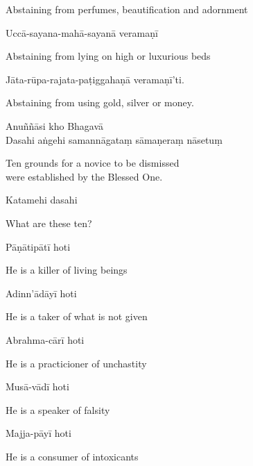 \begin{english}
  Abstaining from perfumes, beautification and adornment
\end{english}

Uccā-sayana-mahā-sayanā veramaṇī

\begin{english}
  Abstaining from lying on high or luxurious beds
\end{english}

Jāta-rūpa-rajata-paṭiggahaṇā veramaṇī'ti.

\begin{english}
  Abstaining from using gold, silver or money.
\end{english}


Anuññāsi kho Bhagavā\\
Dasahi aṅgehi samannāgataṃ sāmaṇeraṃ nāsetuṃ

\begin{english}
  Ten grounds for a novice to be dismissed\\
  were established by the Blessed One.
\end{english}

Katamehi dasahi

\begin{english}
  What are these ten?
\end{english}

Pāṇātipātī hoti

\begin{english}
  He is a killer of living beings
\end{english}

Adinn'ādāyī hoti

\begin{english}
  He is a taker of what is not given
\end{english}

Abrahma-cārī hoti

\begin{english}
  He is a practicioner of unchastity
\end{english}

Musā-vādī hoti

\begin{english}
  He is a speaker of falsity
\end{english}

Majja-pāyī hoti

\begin{english}
  He is a consumer of intoxicants
\end{english}

